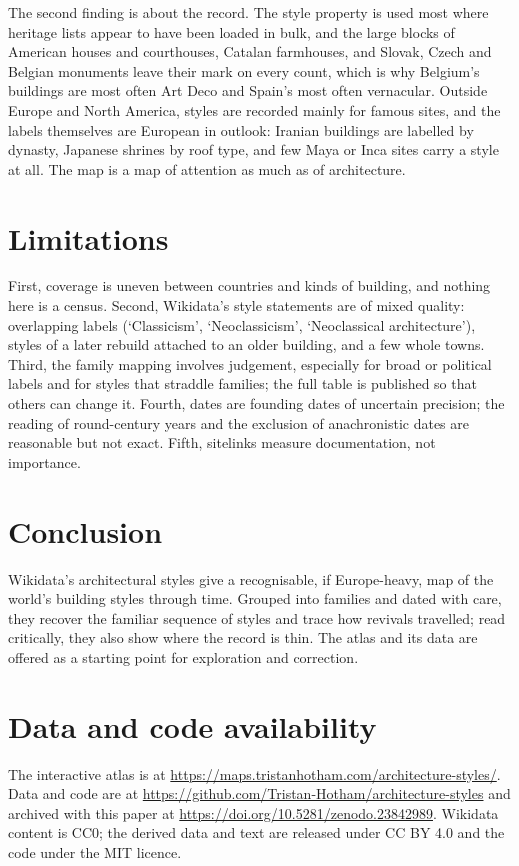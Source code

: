 \documentclass[11pt,a4paper]{article}
\begin{document}
The second finding is about the record. The style property is used most where heritage lists appear to have been loaded in bulk, and the large blocks of American houses and courthouses, Catalan farmhouses, and Slovak, Czech and Belgian monuments leave their mark on every count, which is why Belgium's buildings are most often Art Deco and Spain's most often vernacular. Outside Europe and North America, styles are recorded mainly for famous sites, and the labels themselves are European in outlook: Iranian buildings are labelled by dynasty, Japanese shrines by roof type, and few Maya or Inca sites carry a style at all. The map is a map of attention as much as of architecture.

\section{Limitations}
First, coverage is uneven between countries and kinds of building, and nothing here is a census. Second, Wikidata's style statements are of mixed quality: overlapping labels (`Classicism', `Neoclassicism', `Neoclassical architecture'), styles of a later rebuild attached to an older building, and a few whole towns. Third, the family mapping involves judgement, especially for broad or political labels and for styles that straddle families; the full table is published so that others can change it. Fourth, dates are founding dates of uncertain precision; the reading of round-century years and the exclusion of anachronistic dates are reasonable but not exact. Fifth, sitelinks measure documentation, not importance.

\section{Conclusion}
Wikidata's architectural styles give a recognisable, if Europe-heavy, map of the world's building styles through time. Grouped into families and dated with care, they recover the familiar sequence of styles and trace how revivals travelled; read critically, they also show where the record is thin. The atlas and its data are offered as a starting point for exploration and correction.

\section*{Data and code availability}
The interactive atlas is at \url{https://maps.tristanhotham.com/architecture-styles/}. Data and code are at \url{https://github.com/Tristan-Hotham/architecture-styles} and archived with this paper at \url{https://doi.org/10.5281/zenodo.23842989}. Wikidata content is CC0; the derived data and text are released under CC BY 4.0 and the code under the MIT licence.
\end{document}
